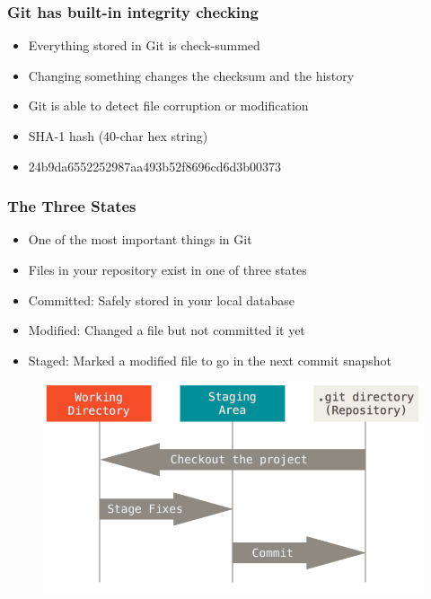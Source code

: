 \documentclass{beamer}
\begin{document}
\begin{frame}
	\frametitle{Git has built-in integrity checking}
	\begin{itemize}
		\item{Everything stored in Git is check-summed}
		\item{Changing something changes the checksum and the history}
		\item{Git is able to detect file corruption or modification}
		\item{SHA-1 hash (40-char hex string)}
		\item{24b9da6552252987aa493b52f8696cd6d3b00373}
	\end{itemize}
\end{frame}

\begin{frame}
	\frametitle{The Three States}
	\begin{itemize}
		\item{One of the most important things in Git}
		\item{Files in your repository exist in one of three states}
		\item{Committed: Safely stored in your local database}
		\item{Modified: Changed a file but not committed it yet}
		\item{Staged: Marked a modified file to go in the next commit snapshot}
	\end{itemize}
	\begin{figure}
		\includegraphics[scale=0.25]{The_Three_States-0.png}
	\end{figure}
\end{frame}
\end{document}
